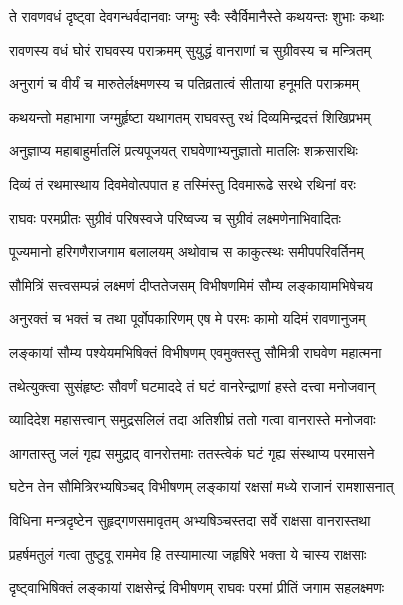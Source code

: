 
\twolineshloka
{ते रावणवधं दृष्ट्वा देवगन्धर्वदानवाः}
{जग्मुः स्वैः स्वैर्विमानैस्ते कथयन्तः शुभाः कथाः} %

\twolineshloka
{रावणस्य वधं घोरं राघवस्य पराक्रमम्}
{सुयुद्धं वानराणां च सुग्रीवस्य च मन्त्रितम्} %

\twolineshloka
{अनुरागं च वीर्यं च मारुतेर्लक्ष्मणस्य च}
{पतिव्रतात्वं सीताया हनूमति पराक्रमम्} %

\twolineshloka
{कथयन्तो महाभागा जग्मुर्हृष्टा यथागतम्}
{राघवस्तु रथं दिव्यमिन्द्रदत्तं शिखिप्रभम्} %

\twolineshloka
{अनुज्ञाप्य महाबाहुर्मातलिं प्रत्यपूजयत्}
{राघवेणाभ्यनुज्ञातो मातलिः शक्रसारथिः} %

\twolineshloka
{दिव्यं तं रथमास्थाय दिवमेवोत्पपात ह}
{तस्मिंस्तु दिवमारूढे सरथे रथिनां वरः} %

\twolineshloka
{राघवः परमप्रीतः सुग्रीवं परिषस्वजे}
{परिष्वज्य च सुग्रीवं लक्ष्मणेनाभिवादितः} %

\twolineshloka
{पूज्यमानो हरिगणैराजगाम बलालयम्}
{अथोवाच स काकुत्स्थः समीपपरिवर्तिनम्} %

\twolineshloka
{सौमित्रिं सत्त्वसम्पन्नं लक्ष्मणं दीप्ततेजसम्}
{विभीषणमिमं सौम्य लङ्कायामभिषेचय} %

\twolineshloka
{अनुरक्तं च भक्तं च तथा पूर्वोपकारिणम्}
{एष मे परमः कामो यदिमं रावणानुजम्} %

\twolineshloka
{लङ्कायां सौम्य पश्येयमभिषिक्तं विभीषणम्}
{एवमुक्तस्तु सौमित्री राघवेण महात्मना} %

\twolineshloka
{तथेत्युक्त्वा सुसंहृष्टः सौवर्णं घटमाददे}
{तं घटं वानरेन्द्राणां हस्ते दत्त्वा मनोजवान्} %

\twolineshloka
{व्यादिदेश महासत्त्वान् समुद्रसलिलं तदा}
{अतिशीघ्रं ततो गत्वा वानरास्ते मनोजवाः} %

\twolineshloka
{आगतास्तु जलं गृह्य समुद्राद् वानरोत्तमाः}
{ततस्त्वेकं घटं गृह्य संस्थाप्य परमासने} %

\twolineshloka
{घटेन तेन सौमित्रिरभ्यषिञ्चद् विभीषणम्}
{लङ्कायां रक्षसां मध्ये राजानं रामशासनात्} %

\twolineshloka
{विधिना मन्त्रदृष्टेन सुहृद्गणसमावृतम्}
{अभ्यषिञ्चस्तदा सर्वे राक्षसा वानरास्तथा} %

\twolineshloka
{प्रहर्षमतुलं गत्वा तुष्टुवू राममेव हि}
{तस्यामात्या जहृषिरे भक्ता ये चास्य राक्षसाः} %

\twolineshloka
{दृष्ट्वाभिषिक्तं लङ्कायां राक्षसेन्द्रं विभीषणम्}
{राघवः परमां प्रीतिं जगाम सहलक्ष्मणः} %

